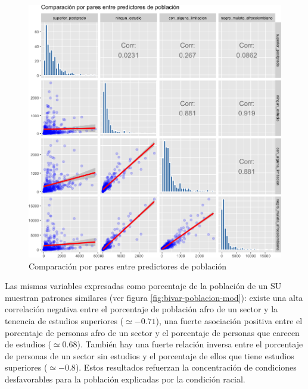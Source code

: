 \documentclass[12pt,a4paper,openany]{book}
\theoremstyle{definition}
\theoremstyle{definition}
\theoremstyle{definition}
\theoremstyle{remark}
\begin{document}
\begin{figure}

{\centering \includegraphics[width=1\linewidth]{tesis-unigis_files/figure-latex/bivar-poblacion-abs-1} 

}

\caption{Comparación por pares entre predictores de población}\label{fig:bivar-poblacion-abs}
\end{figure}

Las mismas variables expresadas como porcentaje de la población de un SU
muestran patrones similares (ver figura \ref{fig:bivar-poblacion-mod}):
existe una alta correlación negativa entre el porcentaje de población
afro de un sector y la tenencia de estudios superiores
(\(\simeq-0.71\)), una fuerte asociación positiva entre el porcentaje de
personas afro de un sector y el porcentaje de personas que carecen de
estudios (\(\simeq 0.68\)). También hay una fuerte relación inversa
entre el porcentaje de personas de un sector sin estudios y el
porcentaje de ellos que tiene estudios superiores (\(\simeq-0.8\)).
Estos resultados refuerzan la concentración de condiciones desfavorables
para la población explicadas por la condición racial.
\end{document}
